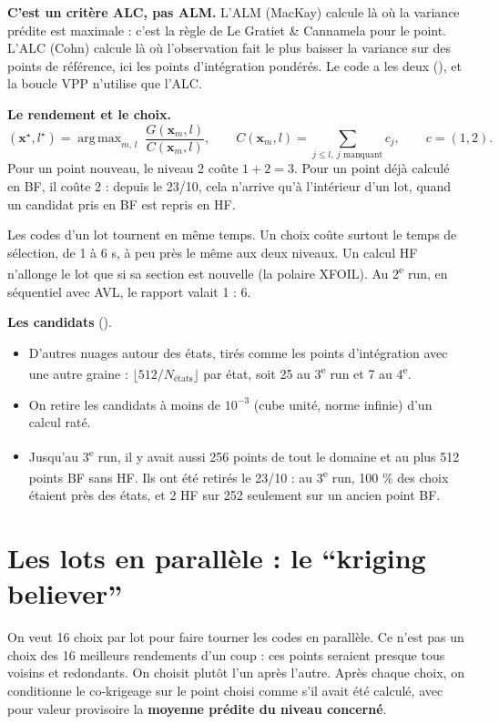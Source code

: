 \documentclass[10pt,a4paper]{article}
\newcommand{\vx}{\bm{x}}
\DeclareMathOperator*{\argmax}{arg\,max}
\begin{document}
\textbf{C'est un critère ALC, pas ALM.} L'ALM (MacKay) calcule là où la variance prédite est maximale :
c'est la règle de Le Gratiet \& Cannamela pour le point. L'ALC (Cohn) calcule là où l'observation fait le
plus baisser la variance sur des points de référence, ici les points d'intégration pondérés. Le code a les
deux (), et la boucle VPP n'utilise que l'ALC.

\textbf{Le rendement et le choix.}
\[
  (\vx^\star,l^\star)=\argmax_{m,\,l}\;\frac{G(\vx_m,l)}{C(\vx_m,l)},\qquad
  C(\vx_m,l)=\sum_{j\le l,\ j\text{ manquant}} c_j,\qquad c=(1,2).
\]
Pour un point nouveau, le niveau 2 coûte $1+2=3$. Pour un point déjà calculé en BF, il coûte 2 : depuis le
23/10, cela n'arrive qu'à l'intérieur d'un lot, quand un candidat pris en BF est repris en HF.

\begin{subtilite}
Les codes d'un lot tournent en même temps. Un choix coûte surtout le temps de sélection, de 1 à 6 s, à peu
près le même aux deux niveaux. Un calcul HF n'allonge le lot que si sa section est nouvelle (la polaire
XFOIL). Au 2\textsuperscript{e} run, en séquentiel avec AVL, le rapport valait 1 : 6.
\end{subtilite}

\textbf{Les candidats} ().
\begin{itemize}
  \item D'autres nuages autour des états, tirés comme les points d'intégration avec une autre graine :
        $\lfloor512/N_{\text{états}}\rfloor$ par état, soit 25 au 3\textsuperscript{e} run et 7 au
        4\textsuperscript{e}.
  \item On retire les candidats à moins de $10^{-3}$ (cube unité, norme infinie) d'un calcul raté.
  \item Jusqu'au 3\textsuperscript{e} run, il y avait aussi 256 points de tout le domaine et au plus 512 points
        BF sans HF. Ils ont été retirés le 23/10 : au 3\textsuperscript{e} run, 100 \% des choix étaient près
        des états, et 2 HF sur 252 seulement sur un ancien point BF.
\end{itemize}

\section{Les lots en parallèle : le \enquote{kriging believer}}
\label{sec:lots}
On veut 16 choix par lot pour faire tourner les codes en parallèle. Ce n'est pas un choix des 16 meilleurs
rendements d'un coup : ces points seraient presque tous voisins et redondants. On choisit plutôt l'un après
l'autre. Après chaque choix, on conditionne le co-krigeage sur le point choisi comme s'il avait été
calculé, avec pour valeur provisoire la \textbf{moyenne prédite du niveau concerné}.
\end{document}
